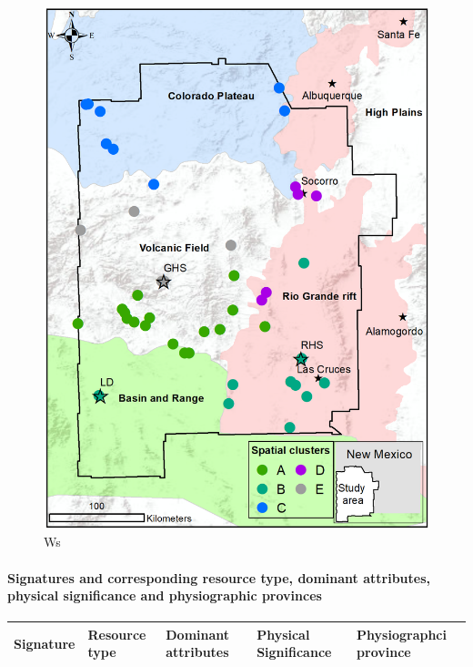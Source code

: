 \documentclass[11pt]{article}
\begin{document}
\begin{figure}
\centering
\includegraphics{../figures-case01/nmfk5.png}
\caption{Ws}
\end{figure}

    \hypertarget{signatures-and-corresponding-resource-type-dominant-attributes-physical-significance-and-physiographic-provinces}{%
\paragraph{Signatures and corresponding resource type, dominant
attributes, physical significance and physiographic
provinces}\label{signatures-and-corresponding-resource-type-dominant-attributes-physical-significance-and-physiographic-provinces}}

\begin{longtable}[]{@{}
  >{\raggedright\arraybackslash}p{}
  >{\raggedright\arraybackslash}p{}
  >{\raggedright\arraybackslash}p{}
  >{\raggedright\arraybackslash}p{}
  >{\raggedright\arraybackslash}p{}@{}}
\toprule
Signature & Resource type & Dominant attributes & Physical Significance
& Physiographci province \\
\midrule
\endhead
\bottomrule
\end{longtable}
\end{document}
